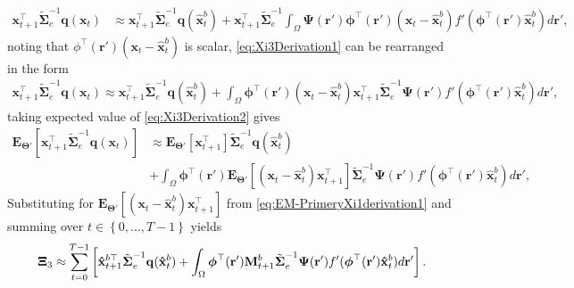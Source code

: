 \documentclass[]{article}
\begin{document}
\begin{align}\label{eq:Xi3Derivation1}
 \mathbf x_{t+1}^\top\tilde{\boldsymbol\Sigma}_e^{-1}\mathbf q( \mathbf x_t) &\approx \mathbf x_{t+1}^\top\tilde{\boldsymbol\Sigma}_e^{-1}\mathbf q(\mathbf {\hat x}_t^b)+\mathbf x_{t+1}^\top\tilde{\boldsymbol\Sigma}_e^{-1}\int_\Omega \boldsymbol{\Psi}(\mathbf{r}')\boldsymbol \phi^\top(\mathbf r') (\mathbf x_t - \mathbf  {\hat x}_t^b)f'(\boldsymbol \phi^\top(\mathbf r')\mathbf {\hat x}_t^b) d\mathbf{r}',
\end{align}
noting that $\phi^\top(\mathbf r') (\mathbf x_t - \mathbf  {\hat x}_t^b)$ is scalar, \eqref{eq:Xi3Derivation1} can be rearranged in the form 
\begin{align}\label{eq:Xi3Derivation2}
 \mathbf x_{t+1}^\top\tilde{\boldsymbol\Sigma}_e^{-1}\mathbf q( \mathbf x_t)\approx\mathbf x_{t+1}^\top\tilde{\boldsymbol\Sigma}_e^{-1}\mathbf q(\mathbf {\hat x}_t^b)+\int_\Omega \boldsymbol \phi^\top(\mathbf r') (\mathbf x_t - \mathbf  {\hat x}_t^b)\mathbf x_{t+1}^\top\tilde{\boldsymbol\Sigma}_e^{-1}\boldsymbol{\Psi}(\mathbf{r}')f'(\boldsymbol \phi^\top(\mathbf r')\mathbf {\hat x}_t^b) d\mathbf{r}',
\end{align}
taking expected value of \eqref{eq:Xi3Derivation2} gives
\begin{align}\label{eq:Xi3Derivation3}
 \mathbf E_{\boldsymbol\Theta'}\left[\mathbf x_{t+1}^\top\tilde{\boldsymbol\Sigma}_e^{-1}\mathbf q( \mathbf x_t)\right] &\approx \mathbf E_{\boldsymbol\Theta'}\left[\mathbf x_{t+1}^\top\right]\tilde{\boldsymbol\Sigma}_e^{-1}\mathbf q(\mathbf {\hat x}_t^b) \nonumber \\
&+\int_\Omega \boldsymbol \phi^\top(\mathbf r')  \mathbf E_{\boldsymbol\Theta'}\left[(\mathbf x_t - \mathbf  {\hat x}_t^b)\mathbf x_{t+1}^\top\right]\tilde{\boldsymbol\Sigma}_e^{-1}\boldsymbol{\Psi}(\mathbf{r}')f'(\boldsymbol \phi^\top(\mathbf r')\mathbf {\hat x}_t^b) d\mathbf{r}',
\end{align}
Substituting for  $\mathbf E_{\boldsymbol\Theta'}\left[(\mathbf x_t - \mathbf  {\hat x}_t^b)\mathbf x_{t+1}^\top\right]$ from \eqref{eq:EM-PrimeryXi1derivation1} and summing over $t \in \left\lbrace 0, \dots, T-1\right\rbrace $ yields
\begin{equation}
\boldsymbol\Xi_{3}\approx\sum_{t=0}^{T-1}\left[ \mathbf{\hat x}_{t+1}^{b\top}\tilde{\boldsymbol\Sigma}_e^{-1}\mathbf q(\mathbf{\hat x}_t^b)+\int_\Omega\boldsymbol \phi^\top(\mathbf r') \mathbf M_{t+1}^b \tilde{\boldsymbol\Sigma}_e^{-1} \boldsymbol{\Psi}(\mathbf{r}') f'(\boldsymbol \phi^\top(\mathbf r')\mathbf {\hat x}_t^b) d\mathbf{r}'\right]. \label{eq:Xi3Ap} \\	
\end{equation}
\end{document}
